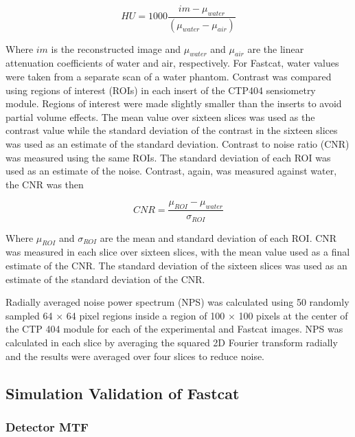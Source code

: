 \begin{equation}
HU = 1000 \frac{im - \mu_{water}}{(\mu_{water} - \mu_{air})}
\end{equation}
                   
Where $im$ is the reconstructed image and $\mu_{water}$ and $\mu_{air}$ are the linear attenuation coefficients of water and air, respectively. For Fastcat, water values were taken from a separate scan of a water phantom. Contrast was compared using regions of interest (ROIs) in each insert of the CTP404 sensiometry module. Regions of interest were made slightly smaller than the inserts to avoid partial volume effects. The mean value over sixteen slices was used as the contrast value while the standard deviation of the contrast in the sixteen slices was used as an estimate of the standard deviation. Contrast to noise ratio (CNR) was measured using the same ROIs. The standard deviation of each ROI was used as an estimate of the noise. Contrast, again, was measured against water, the CNR was then

\begin{equation}
CNR = \frac{\mu_{ROI} - \mu_{water}}{\sigma_{ROI}}
\end{equation}

Where $\mu_{ROI}$ and $\sigma_{ROI}$ are the mean and standard deviation of each ROI. CNR was measured in each slice over sixteen slices, with the mean value used as a final estimate of the CNR. The standard deviation of the sixteen slices was used as an estimate of the standard deviation of the CNR.

Radially averaged noise power spectrum (NPS) was calculated using 50 randomly sampled 64 $\times$ 64 pixel regions inside a region of 100 $\times$ 100 pixels at the center of the CTP 404 module for each of the experimental and Fastcat images. NPS was calculated in each slice by averaging the squared 2D Fourier transform radially and the results were averaged over four slices to reduce noise.

\subsection{Simulation Validation of Fastcat}

\subsubsection{Detector MTF}

